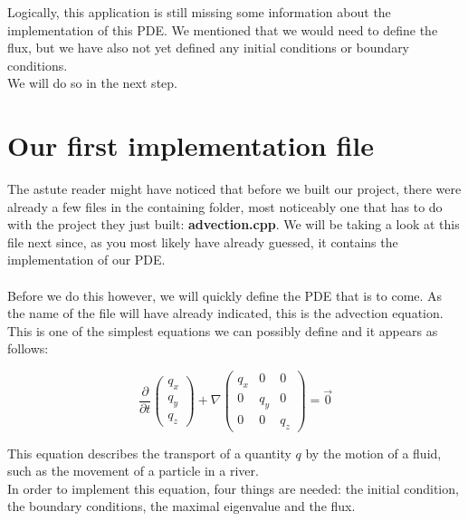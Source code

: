 \documentclass[12pt,letterpaper]{article}
\begin{document}
Logically, this application is still missing some information about the implementation of this PDE. We mentioned that we would need to define the flux, but we have also not yet defined any initial conditions or boundary conditions.\\
We will do so in the next step.

\newpage

\section{Our first implementation file}

The astute reader might have noticed that before we built our project, there were already a few files in the containing folder, most noticeably one that has to do with the project they just built: \textbf{advection.cpp}. We will be taking a look at this file next since, as you most likely have already guessed, it contains the implementation of our PDE.
\\ \\
Before we do this however, we will quickly define the PDE that is to come. As the name of the file will have already indicated, this is the advection equation. This is one of the simplest equations we can possibly define and it appears as follows:

\begin{equation*} \label{Advection_equation}
    \frac{\partial}{\partial t}\left(
    \begin{array}{lr} q_x \\
                      q_y \\
                      q_z 
                      \end{array} \right) +
    \nabla \begin{pmatrix}
                      q_x  & 0   & 0 \\
                      0    & q_y & 0 \\
                      0    & 0   & q_z 
    \end{pmatrix}  = \vec{0}
\end{equation*}

This equation describes the transport of a quantity $q$ by the motion of a fluid, such as the movement of a particle in a river. \\
In order to implement this equation, four things are needed: the initial condition, the boundary conditions, the maximal eigenvalue and the flux.\\
\end{document}
